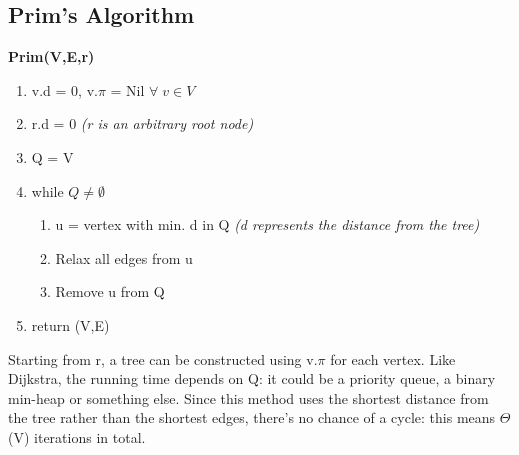 \subsection{Prim's Algorithm}
\textbf{Prim(V,E,r)}
\begin{enumerate}
    \item v.d = 0, v.$\pi$ = Nil \(\forall\; v \in V\)
    \item r.d = 0 \emph{(r is an arbitrary root node)}
    \item Q = V
    \item while \(Q \neq \emptyset\)
    \begin{enumerate}
        \item u = vertex with min. d in Q \emph{(d represents the distance from the tree)}
        \item Relax all edges from u
        \item Remove u from Q
    \end{enumerate}
    \item return (V,E)
\end{enumerate} 
Starting from r, a tree can be constructed using v.$\pi$ for each vertex. Like Dijkstra, the running time depends on Q: it could be a priority queue, a binary min-heap or something else. Since this method uses the shortest distance from the tree rather than the shortest edges, there's no chance of a cycle: this means $\Theta$(V) iterations in total. 
